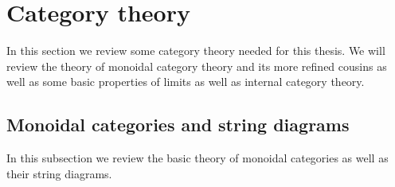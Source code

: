 
\section{Category theory}
\label{sec:cat}

In this section we review some category theory needed for this thesis. We will review the theory of monoidal category theory and its more refined cousins as well as some basic properties of limits as well as internal category theory.

\subsection{Monoidal categories and string diagrams}
\label{subsec:moncat}

In this subsection we review the basic theory of monoidal categories as well as their string diagrams. 

